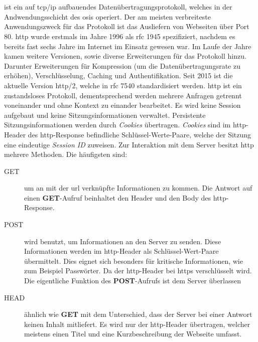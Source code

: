 \documentclass[titlepage]{report}
\begin{document}
\section{}
 ist ein auf \gls{tcp}/\gls{ip} aufbauendes
Datenübertragungsprotokoll, welches in der Andwendungsschicht des
\gls{osi}s operiert. Der am meisten verbreiteste Anwendungszweck für das
Protokoll ist das Ausliefern von Webseiten über Port 80. \gls{http}
wurde erstmals im Jahre 1996 als \gls{rfc} 1945 spezifiziert, nachdem 
es bereits fast sechs Jahre im Internet im Einsatz gewesen
war\cite{RFC1945}. Im Laufe der Jahre kamen weitere Versionen,
sowie diverse Erweiterungen für das Protokoll hinzu. Darunter
Erweiterungen für Kompression (um die Datenübertragungsrate zu erhöhen),
Verschlüsselung, Caching und Authentifikation. Seit 2015 ist die
aktuelle Version \gls{http}/2, welche in \gls{rfc} 7540 standardisiert
werden\cite{RFC7540}. \gls{http} ist ein zustandsloses Protokoll,
dementsprechend werden mehrere Anfragen getrennt voneinander und ohne
Kontext zu einander bearbeitet. Es wird keine Session aufgebaut und
keine Sitzungsinformationen verwaltet. Persistente Sitzungsinformationen 
werden durch \emph{Cookies} übertragen. \emph{Cookies} sind im
\gls{http}\hyp{}Header des \gls{http}\hyp{}Response befindliche
Schlüssel\hyp{}Werte\hyp{}Paare,
welche der Sitzung eine eindeutige \emph{Session ID}
zuweisen\cite{RFC2965}\cite{RFC6265}\cite{RFC2109}.
Zur Interaktion mit dem Server besitzt \gls{http} mehrere Methoden. Die häufigsten sind:
\begin{description}
    \item[GET] um an mit der \gls{url} verknüpfte Informationen zu
        kommen. Die Antwort auf einen \textbf{GET}\hyp{}Aufruf
        beinhaltet den Header und den Body des
        \gls{http}\hyp{}Response\cite[Siehe Section 9.3]{RFC2616}.
    \item[POST] wird benutzt, um Informationen an den Server zu senden.
        Diese Informationen werden im \gls{http}\hyp{}Header als
        Schlüssel\hyp{}Wert\hyp{}Paare übermittelt\cite[Siehe Section
        9.5]{RFC2616}. Dies eignet sich besonders für kritische Informationen, wie zum Beispiel
        Passwörter. Da der \gls{http}\hyp{}Header bei \gls{https}
        verschlüsselt wird. Die eigentliche Funktion des
        \textbf{POST}\hyp{}Aufrufs ist dem Server überlassen\cite[Siehe
        Section 9.3]{RFC2616}
    \item[HEAD] ähnlich wie \textbf{GET} mit dem Unterschied, dass
        der Server bei einer Antwort keinen Inhalt mitliefert. Es wird
        nur der \gls{http}\hyp{}Header übertragen\cite[Siehe Section
        9.4]{RFC2616}, welcher meistens
        einen Titel und eine Kurzbeschreibung der Webseite umfasst.
\end{description}
\end{document}
